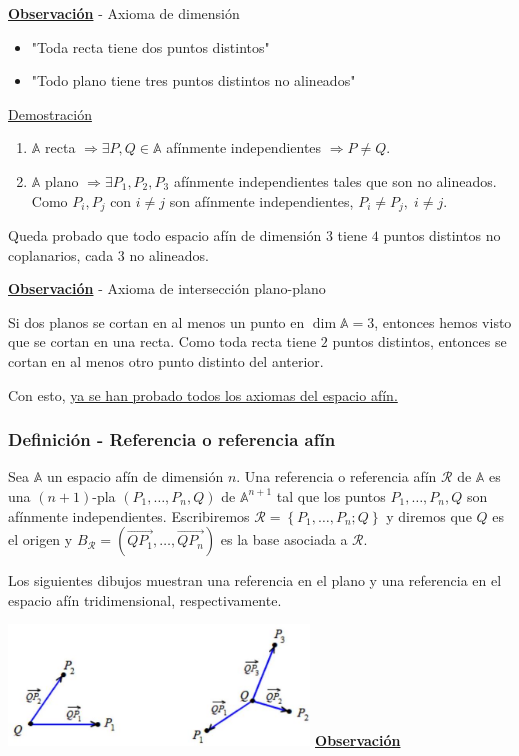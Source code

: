 \documentclass[12pt, a4paper, ones, notitlepage, openany,titlepage]{article}
\newcommand{\demostracion}{\noindent\underline{Demostración}}
\newcommand{\observacion}{\noindent\underline{\textbf{Observación}}}
\begin{document}
\observacion \; - Axioma de dimensión
\begin{itemize}
	\item "Toda recta tiene dos puntos distintos"
	\item "Todo plano tiene tres puntos distintos no alineados"
\end{itemize}
\demostracion
\begin{enumerate}
	\item $\mathbb{A}$ recta $\Longrightarrow \exists P,Q \in \mathbb{A}$ afínmente independientes $\Longrightarrow P \neq Q$.
	\item $\mathbb{A}$ plano $\Longrightarrow \exists P_1, P_2, P_3$ afínmente independientes tales que son no alineados. Como $P_i, P_j$ con $i \neq j$ son afínmente independientes, $P_i \neq P_j, \; i \neq j$.
\end{enumerate}
Queda probado que todo espacio afín de dimensión $3$ tiene $4$ puntos distintos no coplanarios, cada $3$ no alineados.

\observacion \; - Axioma de intersección plano-plano

Si dos planos se cortan en al menos un punto en $\dim \mathbb{A} = 3$, entonces hemos visto que se cortan en una recta. Como toda recta tiene $2$ puntos distintos, entonces se cortan en al menos otro punto distinto del anterior.

\noindent Con esto, \underline{ya se han probado todos los axiomas del espacio afín.}

\subsubsection{Definición - Referencia o referencia afín}
Sea $\mathbb{A}$ un espacio afín de dimensión $n$. Una referencia o referencia afín $\mathcal{R}$ de $\mathbb{A}$ es una $(n+1)$-pla $\left(P_{1}, \ldots, P_{n}, Q\right)$ de $\mathbb{A}^{n+1}$ tal que los puntos $P_{1}, \ldots, P_{n}, Q$ son afínmente independientes. Escribiremos $\mathcal{R}=\left\{P_{1}, \ldots, P_{n} ; Q\right\}$ y diremos que $Q$ es el origen y $B_{\mathcal{R}}=\left(\overrightarrow{Q P_{1}}, \ldots, \overrightarrow{Q P_{n}}\right)$ es la base asociada a $\mathcal{R}$.

Los siguientes dibujos muestran una referencia en el plano y una referencia en el espacio afín tridimensional, respectivamente.

\includegraphics[max width=8cm, center]{2023_03_01_7659aec5e35f9a9b2d3cg-11}
\observacion
\end{document}
